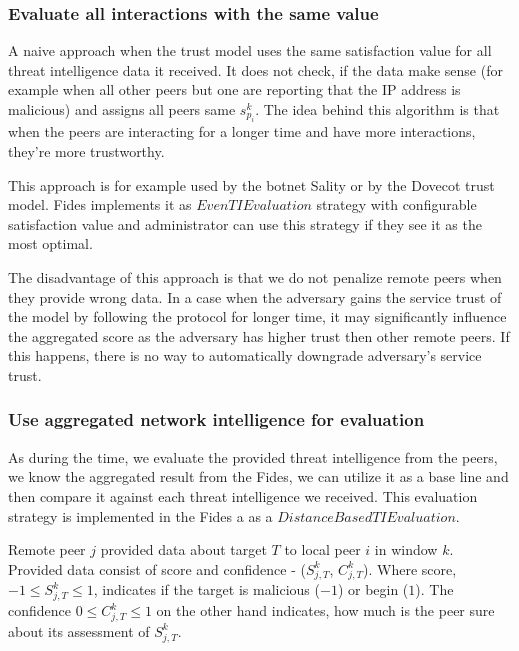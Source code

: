 \subsubsection{Evaluate all interactions with the same value}
A naive approach when the trust model uses the same satisfaction value for all threat intelligence data it received. It does not check, if the data make sense (for example when all other peers but one are reporting that the IP address is malicious) and assigns all peers same $s^{k}_{p_i}$. The idea behind this algorithm is that when the peers are interacting for a longer time and have more interactions, they're more trustworthy.

This approach is for example used by the botnet Sality or by the Dovecot trust model. Fides implements it as $EvenTIEvaluation$ strategy with configurable satisfaction value and administrator can use this strategy if they see it as the most optimal.

The disadvantage of this approach is that we do not penalize remote peers when they provide wrong data. In a case when the adversary gains the service trust of the model by following the protocol for longer time, it may significantly influence the aggregated score as the adversary has higher trust then other remote peers. If this happens, there is no way to automatically downgrade adversary's service trust.

\subsubsection{Use aggregated network intelligence for evaluation}\label{subsub:distance-based-eval}
As during the time, we evaluate the provided threat intelligence from the peers, we know the aggregated result from the Fides, we can utilize it as a base line and then compare it against each threat intelligence we received. This evaluation strategy is implemented in the Fides a as a $DistanceBasedTIEvaluation$.

Remote peer $j$ provided data about target $T$ to local peer $i$ in window $k$. Provided data consist of score and confidence - ($S^{k}_{j, T}$, $C^{k}_{j, T}$). Where score,  $-1 \leq S^{k}_{j, T} \leq 1$, indicates if the target is malicious ($-1$) or begin ($1$). The confidence $0 \leq C^{k}_{j, T} \leq 1$ on the other hand indicates, how much is the peer sure about its assessment of $S^{k}_{j, T}$.

